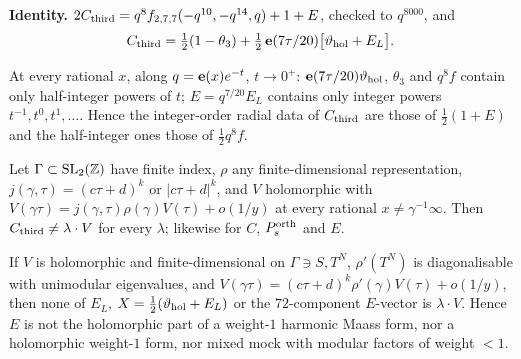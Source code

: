 \noindent\textbf{Identity.} $2C_{\mathrm{third}}=q^8f_{2,7,7}(-q^{10},-q^{14},q)+1+E$, checked to $q^{8000}$, and
\[C_{\mathrm{third}}=\tfrac12(1-\theta_3)+\tfrac12\,\mathbf{e}(7\tau/20)\bigl[\vartheta_{\rm hol}+E_L\bigr].\]

\begin{lemma}\label{lem:parity-cthird}
At every rational $x$, along $q=\mathbf{e}(x)e^{-t}$, $t\to0^+$: $\mathbf{e}(7\tau/20)\vartheta_{\rm hol}$, $\theta_3$ and $q^8f$ contain only half-integer powers of $t$;
$E=q^{7/20}E_L$ contains only integer powers $t^{-1},t^0,t^1,\dots$. Hence the integer-order radial data of $C_{\mathrm{third}}$ are those of $\tfrac12(1+E)$ and
the half-integer ones those of $\tfrac12q^8f$.
\end{lemma}

\begin{theorem}\label{thm:O2}
Let $\Gamma\subset\mathrm{SL}_2(\mathbb{Z})$ have finite index, $\rho$ any finite-dimensional representation, $j(\gamma,\tau)=(c\tau+d)^k$ or $|c\tau+d|^k$, and $V$ holomorphic with
$V(\gamma\tau)=j(\gamma,\tau)\rho(\gamma)V(\tau)+o(1/y)$ at every rational $x\neq\gamma^{-1}\infty$. Then $C_{\mathrm{third}}\neq\lambda\cdot V$ for every $\lambda$; likewise for
$C$, $P^{\mathrm{orth}}_s$ and $E$.
\end{theorem}

\begin{theorem}\label{thm:O1}
If $V$ is holomorphic and finite-dimensional on $\Gamma\ni S,T^N$, $\rho'(T^N)$ is diagonalisable with unimodular eigenvalues, and
$V(\gamma\tau)=(c\tau+d)^k\rho'(\gamma)V(\tau)+o(1/y)$, then none of $E_L$, $X=\tfrac12(\vartheta_{\rm hol}+E_L)$ or the $72$-component $E$-vector is $\lambda\cdot V$.
Hence $E$ is not the holomorphic part of a weight-$1$ harmonic Maass form, nor a holomorphic weight-$1$ form, nor mixed mock with modular factors of weight $<1$.
\end{theorem}

